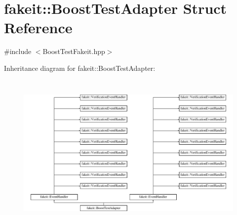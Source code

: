 \hypertarget{structfakeit_1_1BoostTestAdapter}{}\section{fakeit\+::Boost\+Test\+Adapter Struct Reference}
\label{structfakeit_1_1BoostTestAdapter}


{\ttfamily \#include $<$Boost\+Test\+Fakeit.\+hpp$>$}

Inheritance diagram for fakeit\+::Boost\+Test\+Adapter\+:\begin{figure}[H]
\begin{center}
\leavevmode
\includegraphics[height=7.777778cm]{structfakeit_1_1BoostTestAdapter}
\end{center}
\end{figure}
